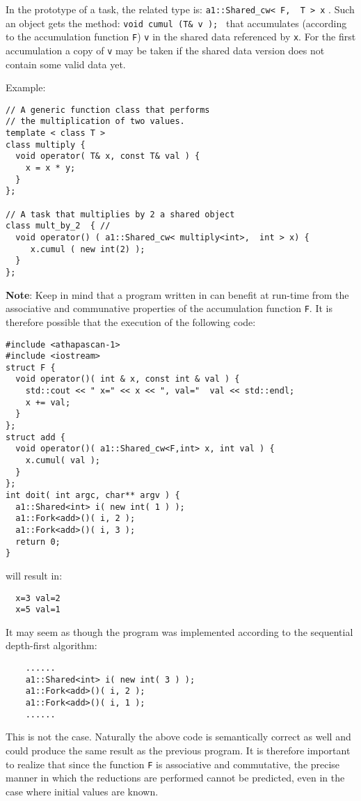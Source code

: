 
 In the prototype of a task, the related type is: 
 { \verb!a1::Shared_cw< F,  T > x! }.
Such an object gets the method:  { \verb+void cumul (T& v ); +} 
that accumulates (according to the accumulation
  function \verb!F!) \verb!v! in the shared data referenced by \verb!x!. For
  the first accumulation a copy of \verb!v! may be taken if the shared data
  version does not contain  some valid data yet.

Example:
\begin{boxit}
\begin{verbatim}
// A generic function class that performs
// the multiplication of two values.
template < class T >
class multiply {
  void operator( T& x, const T& val ) {
    x = x * y;
  }
};

// A task that multiplies by 2 a shared object
class mult_by_2  { //
  void operator() ( a1::Shared_cw< multiply<int>,  int > x) {
     x.cumul ( new int(2) );
  }
};
\end{verbatim}
\end{boxit}
\noindent \textbf{Note}: Keep in mind that a program written in \kaapi can benefit at run-time from 
the associative and communative properties of the accumulation function \texttt{F}.  
It is therefore possible that the execution of the following code:
\begin{boxit}
\begin{verbatim}
#include <athapascan-1>
#include <iostream>
struct F {
  void operator()( int & x, const int & val ) {
    std::cout << " x=" << x << ", val="  val << std::endl;
    x += val;
  }
};
struct add {
  void operator()( a1::Shared_cw<F,int> x, int val ) {
    x.cumul( val );
  }
};
int doit( int argc, char** argv ) {
  a1::Shared<int> i( new int( 1 ) );
  a1::Fork<add>()( i, 2 );
  a1::Fork<add>()( i, 3 );
  return 0;
}
\end{verbatim}
\end{boxit}
will result in:
\begin{verbatim}
  x=3 val=2
  x=5 val=1
\end{verbatim}


It may seem as though the program was implemented according to the sequential depth-first algorithm:
\begin{verbatim}
    ......
    a1::Shared<int> i( new int( 3 ) );
    a1::Fork<add>()( i, 2 );
    a1::Fork<add>()( i, 1 );
    ......
\end{verbatim}
This is not the case.  Naturally the above code is semantically correct as well and could produce the same 
result as the previous program. 
It is therefore important to realize that since the function \verb!F! is 
associative and commutative, the precise manner in which the reductions 
are performed cannot be predicted, even in the case where initial values are known. 



